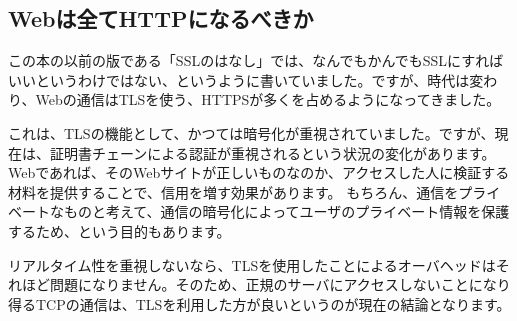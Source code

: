 \subsection{Webは全てHTTPになるべきか}

この本の以前の版である「SSLのはなし」では、なんでもかんでもSSLにすればいいというわけではない、というように書いていました。ですが、時代は変わり、Webの通信はTLSを使う、HTTPSが多くを占めるようになってきました。

これは、TLSの機能として、かつては暗号化が重視されていました。ですが、現在は、証明書チェーンによる認証が重視されるという状況の変化があります。Webであれば、そのWebサイトが正しいものなのか、アクセスした人に検証する材料を提供することで、信用を増す効果があります。
もちろん、通信をプライベートなものと考えて、通信の暗号化によってユーザのプライベート情報を保護するため、という目的もあります。

リアルタイム性を重視しないなら、TLSを使用したことによるオーバヘッドはそれほど問題になりません。そのため、正規のサーバにアクセスしないことになり得るTCPの通信は、TLSを利用した方が良いというのが現在の結論となります。

